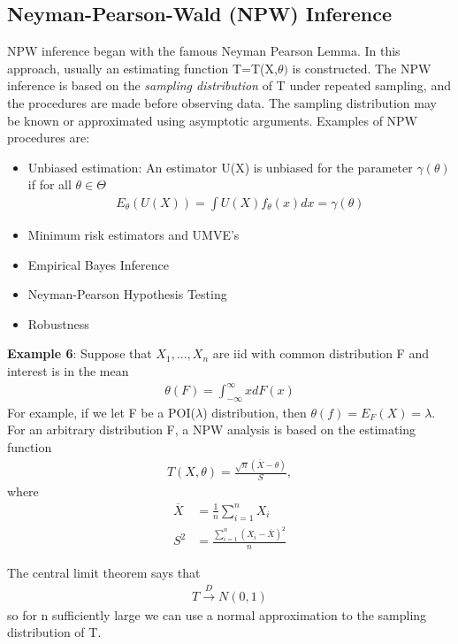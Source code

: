 \documentclass[12pt, oneside]{article}
\begin{document}
\begin{itemize}
 \subsection{Neyman-Pearson-Wald (NPW) Inference}
 NPW inference began with the famous Neyman Pearson Lemma. In this approach, usually an estimating function T=T(X,$\theta)$ is constructed. The NPW inference is based on the \emph{sampling distribution} of T under repeated sampling, and the procedures are made before observing data. The sampling distribution may be known or approximated using asymptotic arguments. Examples of NPW procedures are:
 \begin{itemize}
     \item Unbiased estimation: An estimator U(X) is unbiased for the parameter $\gamma(\theta)$ if for all $\theta \in \Theta$
     \begin{align*}
         E_\theta(U(X)) = \int U(X)f_\theta(x)dx = \gamma(\theta)
     \end{align*}
     \item Minimum risk estimators and UMVE's
     \item Empirical Bayes Inference
     \item Neyman-Pearson Hypothesis Testing
     \item Robustness
 \end{itemize}
 
 \textbf{Example 6}: Suppose that $X_1,...,X_n$ are iid with common distribution F and interest is in the mean 
 \begin{align*}
     \theta(F) = \int_{-\infty}^\infty xdF(x)
 \end{align*}
 For example, if we let F be a POI($\lambda$) distribution, then $\theta(f) = E_F(X) = \lambda$. \\
 For an arbitrary distribution F, a NPW analysis is based on the estimating function
 \begin{align*}
     T(X,\theta) = \frac{\sqrt{n}(\overline{X}-\theta)}{S},
 \end{align*}
 where
 \begin{align*}
     \overline{X} &= \frac{1}{n}\sum_{i=1}^n X_i\\ 
     S^2 &= \frac{\sum_{i=1}^n (X_i - \overline{X})^2}{n}
 \end{align*}
 
 The central limit theorem says that 
 \begin{align*}
     T \overset{D}{\to} N(0,1)
 \end{align*}
 so for n sufficiently large we can use a normal approximation to the sampling distribution of T.
 

\end{itemize}
\end{document}
